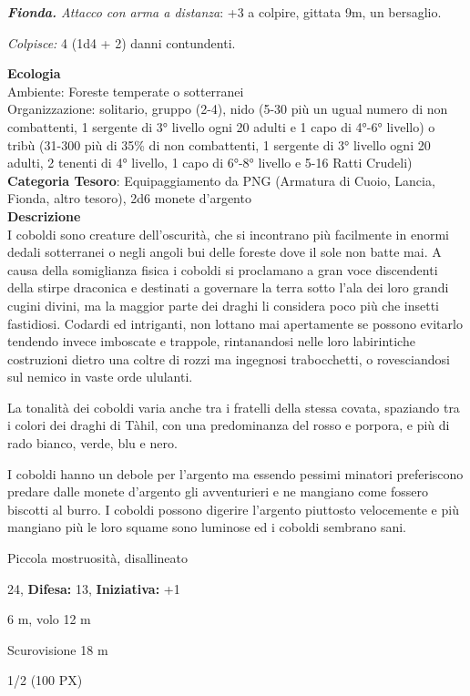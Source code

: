 \begin{multicols}{2}
{\emph{\textbf{Fionda.} Attacco con arma a distanza}: +3 a colpire, gittata 9m, un bersaglio.

\emph{Colpisce:} 4 (1d4 + 2) danni contundenti.

\textbf{Ecologia}\\
Ambiente: Foreste temperate o sotterranei\\
Organizzazione: solitario, gruppo (2-4), nido (5-30 più un ugual numero di non combattenti, 1 sergente di 3° livello ogni 20 adulti e 1 capo di 4°-6° livello) o tribù (31-300 più di 35\% di non combattenti, 1 sergente di 3° livello ogni 20 adulti, 2 tenenti di 4° livello, 1 capo di 6°-8° livello e 5-16 Ratti Crudeli)\\
\textbf{Categoria Tesoro}: Equipaggiamento da PNG (Armatura di Cuoio, Lancia, Fionda, altro tesoro), 2d6 monete d'argento\\
\textbf{Descrizione}\\
I coboldi sono creature dell'oscurità, che si incontrano più facilmente in enormi dedali sotterranei o negli angoli bui delle foreste dove il sole non batte mai. A causa della somiglianza fisica i coboldi si proclamano a gran voce discendenti della stirpe draconica e destinati a governare la terra sotto l'ala dei loro grandi cugini divini, ma la maggior parte dei draghi li considera poco più che insetti fastidiosi. Codardi ed intriganti, non lottano mai apertamente se possono evitarlo tendendo invece imboscate e trappole, rintanandosi nelle loro labirintiche costruzioni dietro una coltre di rozzi ma ingegnosi trabocchetti, o rovesciandosi sul nemico in vaste orde ululanti.

La tonalità dei coboldi varia anche tra i fratelli della stessa covata, spaziando tra i colori dei draghi di Tàhil, con una predominanza del rosso e porpora, e più di rado bianco, verde, blu e nero.

I coboldi hanno un debole per l'argento ma essendo pessimi minatori preferiscono predare dalle monete d'argento gli avventurieri e ne mangiano come fossero biscotti al burro. I coboldi possono digerire l'argento piuttosto velocemente e più mangiano più le loro squame sono luminose ed i coboldi sembrano sani.

\begin{description}[noitemsep, topsep=0pt, parsep=0pt, partopsep=0pt, leftmargin=0cm, labelwidth=2.2cm]
	\item[\textbf{Taglia/Tipo:}] Piccola mostruosità, disallineato
	\item[\textbf{Caratt.:}] 
	\item[\textbf{Punti Ferita:}] 24,  \textbf{Difesa:} 13,  \textbf{Iniziativa:} +1
	\item[\textbf{Movimento:}] 6 m, volo 12 m
	\item[\textbf{Tiri Salvez.:}] 
	\item[\textbf{Sensi:}] Scurovisione 18 m
	\item[\textbf{Sfida:}] 1/2 (100 PX)\smallskip
\end{description}

}
\end{multicols}
